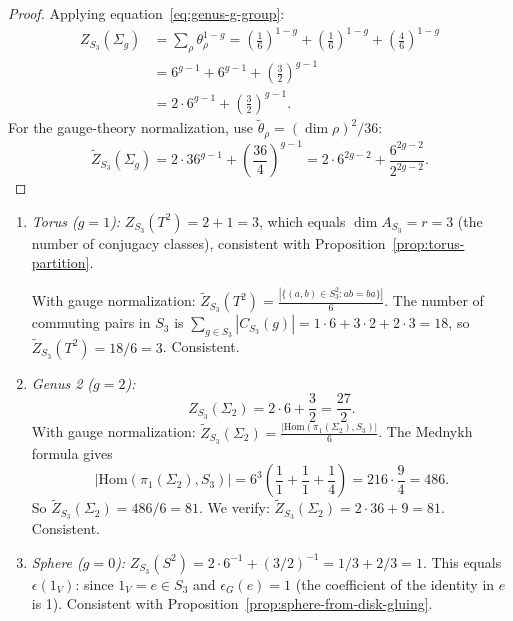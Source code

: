 \begin{proof}
Applying equation~\eqref{eq:genus-g-group}:
\begin{align}
Z_{S_3}(\Sigma_g) &= \sum_{\rho} \theta_\rho^{1-g} = \left(\frac{1}{6}\right)^{1-g} + \left(\frac{1}{6}\right)^{1-g} + \left(\frac{4}{6}\right)^{1-g} \label{eq:S3-calc-start} \\
&= 6^{g-1} + 6^{g-1} + \left(\frac{3}{2}\right)^{g-1} \nonumber \\
&= 2 \cdot 6^{g-1} + \left(\frac{3}{2}\right)^{g-1}. \label{eq:S3-calc-end}
\end{align}
For the gauge-theory normalization, use $\widetilde{\theta}_\rho = (\dim\rho)^2/36$:
\begin{equation}\label{eq:S3-gauge-calc}
\widetilde{Z}_{S_3}(\Sigma_g) = 2 \cdot 36^{g-1} + \left(\frac{36}{4}\right)^{g-1} = 2 \cdot 6^{2g-2} + \frac{6^{2g-2}}{2^{2g-2}}.
\end{equation}
\end{proof}

\begin{example}\label{ex:S3-low-genus}
\begin{enumerate}
\item \emph{Torus ($g=1$):} $Z_{S_3}(T^2) = 2 + 1 = 3$, which equals $\dim A_{S_3} = r = 3$ (the number of conjugacy classes), consistent with Proposition~\ref{prop:torus-partition}.

With gauge normalization: $\widetilde{Z}_{S_3}(T^2) = \frac{|\{(a,b) \in S_3^2 : ab = ba\}|}{6}$. The number of commuting pairs in $S_3$ is $\sum_{g \in S_3} |C_{S_3}(g)| = 1\cdot 6 + 3\cdot 2 + 2\cdot 3 = 18$, so $\widetilde{Z}_{S_3}(T^2) = 18/6 = 3$. Consistent.

\item \emph{Genus 2 ($g=2$):}
\begin{equation}\label{eq:S3-genus-2}
Z_{S_3}(\Sigma_2) = 2 \cdot 6 + \frac{3}{2} = \frac{27}{2}.
\end{equation}
With gauge normalization: $\widetilde{Z}_{S_3}(\Sigma_2) = \frac{|\mathrm{Hom}(\pi_1(\Sigma_2), S_3)|}{6}$. The Mednykh formula gives
\begin{equation}\label{eq:S3-genus-2-mednykh}
|\mathrm{Hom}(\pi_1(\Sigma_2), S_3)| = 6^3\left(\frac{1}{1} + \frac{1}{1} + \frac{1}{4}\right) = 216 \cdot \frac{9}{4} = 486.
\end{equation}
So $\widetilde{Z}_{S_3}(\Sigma_2) = 486/6 = 81$. We verify: $\widetilde{Z}_{S_3}(\Sigma_2) = 2 \cdot 36 + 9 = 81$. Consistent.

\item \emph{Sphere ($g=0$):} $Z_{S_3}(S^2) = 2 \cdot 6^{-1} + (3/2)^{-1} = 1/3 + 2/3 = 1$. This equals $\epsilon(1_V)$: since $1_V = e \in S_3$ and $\epsilon_G(e) = 1$ (the coefficient of the identity in $e$ is 1). Consistent with Proposition~\ref{prop:sphere-from-disk-gluing}.
\end{enumerate}
\end{example}

